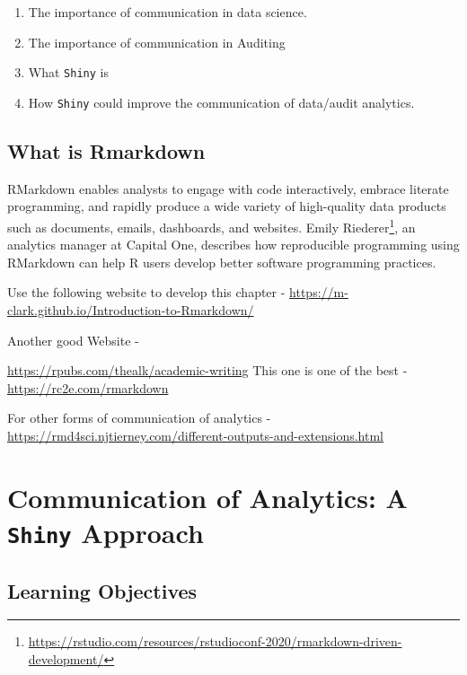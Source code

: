 \documentclass[
]{book}
\providecommand{\tightlist}{%
  \setlength{\itemsep}{0pt}\setlength{\parskip}{0pt}}
\begin{document}
\begin{enumerate}
\def\labelenumi{\arabic{enumi}.}
\tightlist
\item
  The importance of communication in data science.
\item
  The importance of communication in Auditing
\item
  What \texttt{Shiny} is
\item
  How \texttt{Shiny} could improve the communication of data/audit analytics.
\end{enumerate}

\hypertarget{what-is-rmarkdown}{%
\section{What is Rmarkdown}\label{what-is-rmarkdown}}

RMarkdown enables analysts to engage with code interactively, embrace literate programming, and rapidly produce a wide variety of high-quality data products such as documents, emails, dashboards, and websites. Emily Riederer\footnote{\url{https://rstudio.com/resources/rstudioconf-2020/rmarkdown-driven-development/}}, an analytics manager at Capital One, describes how reproducible programming using RMarkdown can help R users develop better software programming practices.

Use the following website to develop this chapter -
\url{https://m-clark.github.io/Introduction-to-Rmarkdown/}

Another good Website -

\url{https://rpubs.com/thealk/academic-writing}
This one is one of the best - \url{https://rc2e.com/rmarkdown}

For other forms of communication of analytics - \url{https://rmd4sci.njtierney.com/different-outputs-and-extensions.html}

\hypertarget{communication-of-analytics-a-shiny-approach}{%
\chapter{\texorpdfstring{Communication of Analytics: A \texttt{Shiny} Approach}{Communication of Analytics: A Shiny Approach}}\label{communication-of-analytics-a-shiny-approach}}

\hypertarget{learning-objectives-1}{%
\section*{Learning Objectives}\label{learning-objectives-1}}
\end{document}
